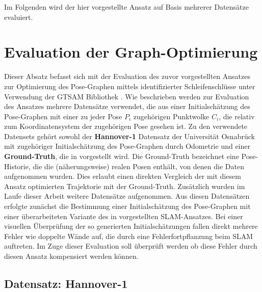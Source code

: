 Im Folgenden wird der hier vorgestellte Ansatz auf Basis mehrerer Datensätze evaluiert.

\section{Evaluation der Graph-Optimierung}

Dieser Absatz befasst sich mit der Evaluation des zuvor vorgestellten Ansatzes zur Optimierung des Pose-Graphen mittels identifizierter Schleifenschlüsse unter Verwendung der GTSAM Bibliothek \cite{dellaert2012factor}. Wie beschrieben werden zur Evaluation des Ansatzes mehrere Datensätze verwendet, die aus einer Initialschätzung des Pose-Graphen mit einer zu jeder Pose $P_i$ zugehörigen Punktwolke $C_i$, die relativ zum Koordinatensystem der zugehörigen Pose gesehen ist. Zu den verwendete Datensets gehört sowohl der \textbf{Hannover-1} Datensatz der Universität Osnabrück mit zugehöriger Initialschätzung des Pose-Graphen durch Odometrie und einer \textbf{Ground-Truth}, die in \cite{sprickerhof2011heuristic} vorgestellt wird. Die Ground-Truth bezeichnet eine Pose-Historie, die die (näherungsweise) realen Posen enthält, von denen die Daten aufgenommen wurden. Dies erlaubt einen direkten Vergleich der mit diesem Ansatz optimierten Trajektorie mit der Ground-Truth. Zusätzlich wurden im Laufe dieser Arbeit weitere Datensätze aufgenommen. Aus diesen Datensätzen erfolgte zunächst die Bestimmung einer Initialschätzung des Pose-Graphen mit einer überarbeiteten Variante des in \cite{zhang2014loam} vorgestellten SLAM-Ansatzes. Bei einer visuellen Überprüfung der so generierten Initialschätzungen fallen direkt mehrere Fehler wie doppelte Wände auf, die durch eine Fehlerfortpflanzung beim SLAM auftreten. Im Zuge dieser Evaluation soll überprüft werden ob diese Fehler durch diesen Ansatz kompensiert werden können.

\subsection{Datensatz: Hannover-1}


